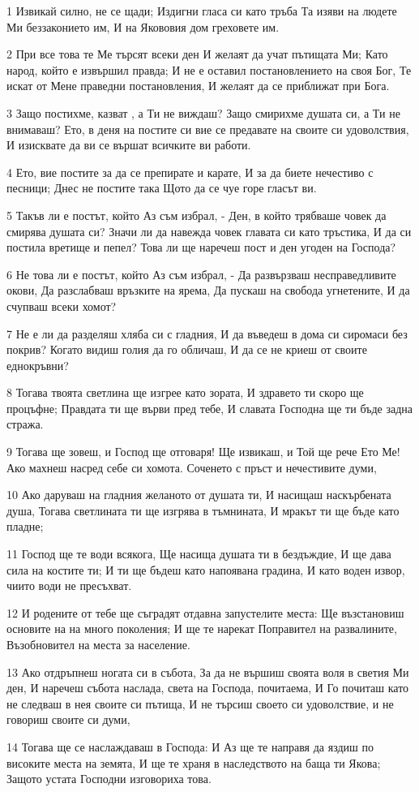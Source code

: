 \par 1 Извикай силно, не се щади; Издигни гласа си като тръба Та изяви на людете Ми беззаконието им, И на Якововия дом греховете им.
\par 2 При все това те Ме търсят всеки ден И желаят да учат пътищата Ми; Като народ, който е извършил правда; И не е оставил постановлението на своя Бог, Те искат от Мене праведни постановления, И желаят да се приближат при Бога.
\par 3 Защо постихме, казват , а Ти не виждаш? Защо смирихме душата си, а Ти не внимаваш? Ето, в деня на постите си вие се предавате на своите си удоволствия, И изисквате да ви се вършат всичките ви работи.
\par 4 Ето, вие постите за да се препирате и карате, И за да биете нечестиво с песници; Днес не постите така Щото да се чуе горе гласът ви.
\par 5 Такъв ли е постът, който Аз съм избрал, - Ден, в който трябваше човек да смирява душата си? Значи ли да навежда човек главата си като тръстика, И да си постила вретище и пепел? Това ли ще наречеш пост и ден угоден на Господа?
\par 6 Не това ли е постът, който Аз съм избрал, - Да развързваш несправедливите окови, Да разслабваш връзките на ярема, Да пускаш на свобода угнетените, И да счупваш всеки хомот?
\par 7 Не е ли да разделяш хляба си с гладния, И да въведеш в дома си сиромаси без покрив? Когато видиш голия да го обличаш, И да се не криеш от своите еднокръвни?
\par 8 Тогава твоята светлина ще изгрее като зората, И здравето ти скоро ще процъфне; Правдата ти ще върви пред тебе, И славата Господна ще ти бъде задна стража.
\par 9 Тогава ще зовеш, и Господ ще отговаря! Ще извикаш, и Той ще рече Ето Ме! Ако махнеш насред себе си хомота. Соченето с пръст и нечестивите думи,
\par 10 Ако даруваш на гладния желаното от душата ти, И насищаш наскърбената душа, Тогава светлината ти ще изгрява в тъмнината, И мракът ти ще бъде като пладне;
\par 11 Господ ще те води всякога, Ще насища душата ти в бездъждие, И ще дава сила на костите ти; И ти ще бъдеш като напоявана градина, И като воден извор, чиито води не пресъхват.
\par 12 И родените от тебе ще съградят отдавна запустелите места: Ще възстановиш основите на на много поколения; И ще те нарекат Поправител на развалините, Възобновител на места за население.
\par 13 Ако отдръпнеш ногата си в събота, За да не вършиш своята воля в светия Ми ден, И наречеш събота наслада, света на Господа, почитаема, И Го почиташ като не следваш в нея своите си пътища, И не търсиш своето си удоволствие, и не говориш своите си думи,
\par 14 Тогава ще се наслаждаваш в Господа: И Аз ще те направя да яздиш по високите места на земята, И ще те храня в наследството на баща ти Якова; Защото устата Господни изговориха това.

